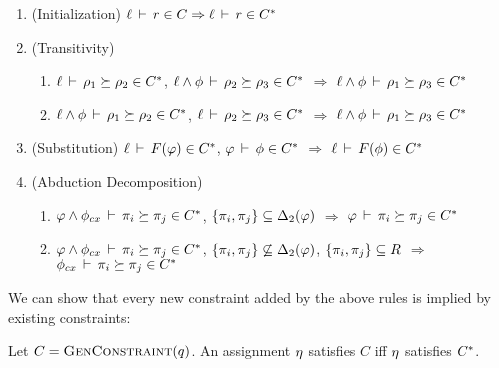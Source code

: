 \begin{enumerate}

\item (Initialization) $\ell\,\vdash\,r \in C \Rightarrow \ell\,\vdash\,r \in {C}^*$

\item (Transitivity)
  \label{item:transitivity}
\begin{enumerate}
\item
$\ell\,\vdash\,\rho_1 \succeq \rho_2 \in {C}^*$,
$\ell \wedge \phi\,\vdash\,\rho_2 \succeq \rho_3 \in {C}^*$
$\Rightarrow$
$\ell \wedge \phi\,\vdash\,\rho_1 \succeq \rho_3 \in {C}^*$
\item
$\ell \wedge \phi\,\vdash\,\rho_1 \succeq \rho_2 \in {C}^*$,
$\ell\,\vdash\,\rho_2 \succeq \rho_3 \in {C}^*$
$\Rightarrow$
$\ell \wedge \phi\,\vdash\,\rho_1 \succeq \rho_3 \in {C}^*$
\end{enumerate}

\item (Substitution)
  \label{item:subst}
$\ell\,\vdash\,F(\varphi) \in {C}^*$,
$\varphi\,\vdash\,\phi \in {C}^*$
$\Rightarrow$ $\ell\,\vdash\,F(\phi) \in {C}^*$

\item (Abduction Decomposition)
\label{item:context}
\begin{enumerate}
\item
$\varphi \wedge \phi_{cx}\,\vdash\,\pi_i \succeq \pi_j \in {C}^*$,
$\{ \pi_i, \pi_j \} \subseteq {\Delta_2}(\varphi)$
$\Rightarrow$
$\varphi\,\vdash\,\pi_i \succeq \pi_j \in {C}^* $

\item 
$\varphi \wedge \phi_{cx}\,\vdash\,\pi_i \succeq \pi_j \in {C}^*$,
$\{ \pi_i, \pi_j \} \not\subseteq {\Delta_2}(\varphi)$,
$\{ \pi_i, \pi_j \} \subseteq R$
$\Rightarrow$
$\phi_{cx}\,\vdash\,\pi_i \succeq \pi_j \in {C}^* $
\end{enumerate}

\end{enumerate}

We can show that every new constraint added by the above rules is implied by existing
constraints:

\begin{theorem}
  \label{thm:closure}
Let $C = \textsc{GenConstraint}(q)$.
An assignment $\eta$ satisfies $C$ iff $\eta$ satisfies ${C}^*$.
\end{theorem}

